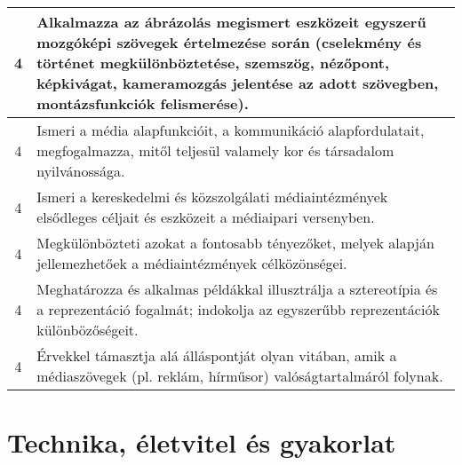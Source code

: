 \begin{longtable}{c | p{12cm} }
                                
                                          4 &  Alkalmazza az ábrázolás megismert eszközeit egyszerű mozgóképi szövegek értelmezése során (cselekmény és történet megkülönböztetése, szemszög, nézőpont, képkivágat, kameramozgás jelentése az adott szövegben, montázsfunkciók felismerése). \\ \hline
                                          4 &  Ismeri a média alapfunkcióit, a kommunikáció alapfordulatait, megfogalmazza, mitől teljesül valamely kor és társadalom nyilvánossága. \\ \hline
                                          4 &  Ismeri a kereskedelmi és közszolgálati médiaintézmények elsődleges céljait és eszközeit a médiaipari versenyben. \\ \hline
                                          4 &  Megkülönbözteti azokat a fontosabb tényezőket, melyek alapján jellemezhetőek a médiaintézmények célközönségei. \\ \hline
                                          4 &  Meghatározza és alkalmas példákkal illusztrálja a sztereotípia és a reprezentáció fogalmát; indokolja az egyszerűbb reprezentációk különbözőségeit. \\ \hline
                                          4 &  Érvekkel támasztja alá álláspontját olyan vitában, amik a médiaszövegek (pl. reklám, hírműsor) valóságtartalmáról folynak. \\ \hline
                                      
                        \end{longtable}
            \clearpage

        \section{Technika, életvitel és gyakorlat}

